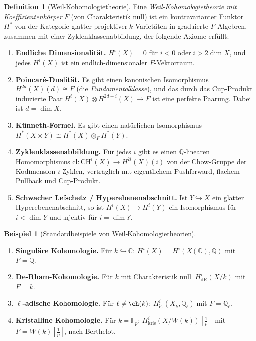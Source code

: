 \documentclass[12pt,a4paper]{amsart}
\theoremstyle{definition}
\newtheorem{example}[theorem]{Beispiel}
\newtheorem{definition_de}[theorem]{Definition}
\newcommand{\Q}{\mathbb{Q}}
\newcommand{\C}{\mathbb{C}}
\newcommand{\Fp}{\mathbb{F}_p}
\newcommand{\CH}{\mathrm{CH}}
\newcommand{\cl}{\mathrm{cl}}
\begin{document}
\begin{definition_de}[Weil-Kohomologietheorie]
Eine \emph{Weil-Kohomologietheorie mit Koeffizientenkörper $F$} (von
Charakteristik null) ist ein kontravarianter Funktor $H^*$ von der
Kategorie glatter projektiver $k$-Varietäten in graduierte $F$-Algebren,
zusammen mit einer Zyklenklassenabbildung, der folgende Axiome erfüllt:
\begin{enumerate}[label=(\roman*)]
  \item \textbf{Endliche Dimensionalität.}  $H^i(X) = 0$ für $i < 0$ oder
        $i > 2\dim X$, und jedes $H^i(X)$ ist ein endlich-dimensionaler
        $F$-Vektorraum.
  \item \textbf{Poincaré-Dualität.}  Es gibt einen kanonischen Isomorphismus
        $H^{2d}(X)(d) \cong F$ (die \emph{Fundamentalklasse}), und das durch
        das Cup-Produkt induzierte Paar
        $H^i(X) \otimes H^{2d-i}(X) \to F$ ist eine perfekte Paarung.
        Dabei ist $d = \dim X$.
  \item \textbf{Künneth-Formel.}  Es gibt einen natürlichen Isomorphismus
        $H^*(X \times Y) \cong H^*(X) \otimes_F H^*(Y)$.
  \item \textbf{Zyklenklassenabbildung.}  Für jedes $i$ gibt es einen
        $\Q$-linearen Homomorphismus
        $\cl: \CH^i(X) \to H^{2i}(X)(i)$
        von der Chow-Gruppe der Kodimension-$i$-Zyklen, verträglich mit
        eigentlichem Pushforward, flachem Pullback und Cup-Produkt.
  \item \textbf{Schwacher Lefschetz / Hyperebenenabschnitt.}  Ist
        $Y \hookrightarrow X$ ein glatter Hyperebenenabschnitt, so ist
        $H^i(X) \to H^i(Y)$ ein Isomorphismus für $i < \dim Y$ und
        injektiv für $i = \dim Y$.
\end{enumerate}
\end{definition_de}

\begin{example}[Standardbeispiele von Weil-Kohomologietheorien]
\begin{enumerate}[label=(\alph*)]
  \item \textbf{Singuläre Kohomologie.}  Für $k \hookrightarrow \C$:
        $H^i(X) = H^i(X(\C),\Q)$ mit $F = \Q$.
  \item \textbf{De-Rham-Kohomologie.}  Für $k$ mit Charakteristik null:
        $H^i_{\mathrm{dR}}(X/k)$ mit $F = k$.
  \item \textbf{$\ell$-adische Kohomologie.}  Für $\ell \neq \ch(k)$:
        $H^i_{\mathrm{\acute{e}t}}(X_{\bar k}, \Q_\ell)$ mit $F = \Q_\ell$.
  \item \textbf{Kristalline Kohomologie.}  Für $k = \Fp$:
        $H^i_{\mathrm{kris}}(X/W(k))[\frac{1}{p}]$ mit $F = W(k)[\frac{1}{p}]$,
        nach Berthelot.
\end{enumerate}
\end{example}
\end{document}
